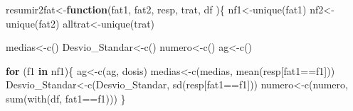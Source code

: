 \documentclass[
]{article}
\newenvironment{Shaded}{\begin{snugshade}}{\end{snugshade}}
\newcommand{\ControlFlowTok}[1]{\textcolor[rgb]{0.13,0.29,0.53}{\textbf{#1}}}
\newcommand{\FunctionTok}[1]{\textcolor[rgb]{0.00,0.00,0.00}{#1}}
\newcommand{\NormalTok}[1]{#1}
\newcommand{\OtherTok}[1]{\textcolor[rgb]{0.56,0.35,0.01}{#1}}
\newcommand{\SpecialCharTok}[1]{\textcolor[rgb]{0.00,0.00,0.00}{#1}}
\newcommand{\StringTok}[1]{\textcolor[rgb]{0.31,0.60,0.02}{#1}}
\begin{document}
\begin{Shaded}
\begin{Highlighting}[]
\NormalTok{resumir2fat}\OtherTok{\textless{}{-}}\ControlFlowTok{function}\NormalTok{(fat1, }
\NormalTok{                      fat2, }
\NormalTok{                      resp,}
\NormalTok{                      trat,}
\NormalTok{                      df}
\NormalTok{)\{}
\NormalTok{  nf1}\OtherTok{\textless{}{-}}\FunctionTok{unique}\NormalTok{(fat1)}
\NormalTok{  nf2}\OtherTok{\textless{}{-}}\FunctionTok{unique}\NormalTok{(fat2)}
\NormalTok{  alltrat}\OtherTok{\textless{}{-}}\FunctionTok{unique}\NormalTok{(trat)}
  
\NormalTok{  medias}\OtherTok{\textless{}{-}}\FunctionTok{c}\NormalTok{()}
\NormalTok{  Desvio\_Standar}\OtherTok{\textless{}{-}}\FunctionTok{c}\NormalTok{()}
\NormalTok{  numero}\OtherTok{\textless{}{-}}\FunctionTok{c}\NormalTok{()}
\NormalTok{  ag}\OtherTok{\textless{}{-}}\FunctionTok{c}\NormalTok{()}
  
  \ControlFlowTok{for}\NormalTok{ (f1 }\ControlFlowTok{in}\NormalTok{ nf1)\{}
\NormalTok{    ag}\OtherTok{\textless{}{-}}\FunctionTok{c}\NormalTok{(ag, }\StringTok{\textquotesingle{}dosis\textquotesingle{}}\NormalTok{)}
\NormalTok{    medias}\OtherTok{\textless{}{-}}\FunctionTok{c}\NormalTok{(medias, }\FunctionTok{mean}\NormalTok{(resp[fat1}\SpecialCharTok{==}\NormalTok{f1]))}
\NormalTok{    Desvio\_Standar}\OtherTok{\textless{}{-}}\FunctionTok{c}\NormalTok{(Desvio\_Standar, }\FunctionTok{sd}\NormalTok{(resp[fat1}\SpecialCharTok{==}\NormalTok{f1]))}
\NormalTok{    numero}\OtherTok{\textless{}{-}}\FunctionTok{c}\NormalTok{(numero, }\FunctionTok{sum}\NormalTok{(}\FunctionTok{with}\NormalTok{(df, fat1}\SpecialCharTok{==}\NormalTok{f1)))}
\NormalTok{  \}}
 

\end{Highlighting}
\end{Shaded}
\end{document}
